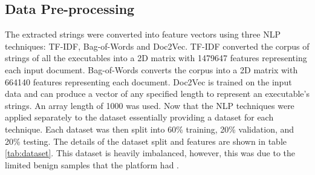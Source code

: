 \documentclass[conference]{IEEEtran}
\begin{document}
\subsection{Data Pre-processing}
The extracted strings were converted into feature vectors using three NLP techniques: TF-IDF, Bag-of-Words and Doc2Vec. 
TF-IDF converted the corpus of strings of all the executables into a 2D matrix with 1479647 features representing each input document. Bag-of-Words converts the corpus into a 2D matrix with 664140 features representing each document. Doc2Vec is trained on the input data and can produce a vector of any specified length to represent an executable's strings. An array length of 1000 was used. Now that the NLP techniques were applied separately to the dataset essentially providing a dataset for each technique. Each dataset was then split into 60\% training, 20\% validation, and 20\% testing. The details of the dataset split and features are shown in table \ref{tab:dataset}. This dataset is heavily imbalanced, however, this was due to the limited benign samples that the platform had \cite{malfe}. 
 
\begin{table}[H]
\caption{\label{tab:dataset} NLP data metrics.}
\end{table}

  
 
\end{document}
